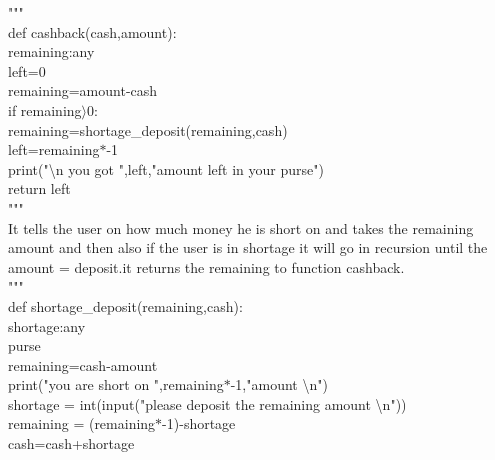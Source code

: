 \documentclass[10pt,a4paper]{article}
\begin{document}
\begin{flushleft}
"""\\
def cashback(cash,amount):\\
\hspace*{0.5cm}    remaining:any\\
\hspace*{0.5cm}    left=0\\
\hspace*{0.5cm}    remaining=amount-cash\\
\hspace*{0.5cm}    if remaining$\rangle$0:\\
\hspace*{0.5cm}\hspace*{0.5cm}        remaining=shortage\_deposit(remaining,cash)\\
\hspace*{0.5cm}    left=remaining$\ast$-1\\
\hspace*{0.5cm}    print("\textbackslash n you got ",left,"amount left in your purse")\\
\hspace*{0.5cm}   return left\\
\bigskip
"""\\
It tells the user on how much money he is short on and takes the remaining amount and then also if the user is in shortage 
it will go in recursion until the amount = deposit.it returns the remaining to function cashback.\\
"""\\  
def shortage\_deposit(remaining,cash):\\
\hspace*{0.5cm}    shortage:any\\
\hspace*{0.5cm}    purse\\
\hspace*{0.5cm}    remaining=cash-amount\\
\hspace*{0.5cm}    print("you are short on ",remaining$\ast$-1,"amount \textbackslash n")\\
\hspace*{0.5cm}    shortage = int(input("please deposit the  remaining amount \textbackslash n"))\\
\hspace*{0.5cm}    remaining = (remaining$\ast$-1)-shortage\\
\hspace*{0.5cm}    cash=cash+shortage\\

\end{flushleft}
\end{document}
